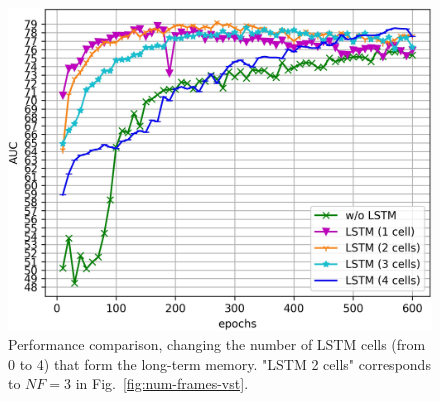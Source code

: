 \begin{figure}[b!]
\centerline{\includegraphics[clip,width=\figsize]{images/exp_2.jpg}}
	\caption{Performance comparison, changing the number of LSTM cells (from 0 to 4) that form the long-term memory. "LSTM 2 cells" corresponds to $\mathit{NF}=3$  in Fig.~\ref{fig:num-frames-vst}.}
	\label{fig:num-memory-cells}
\end{figure}

